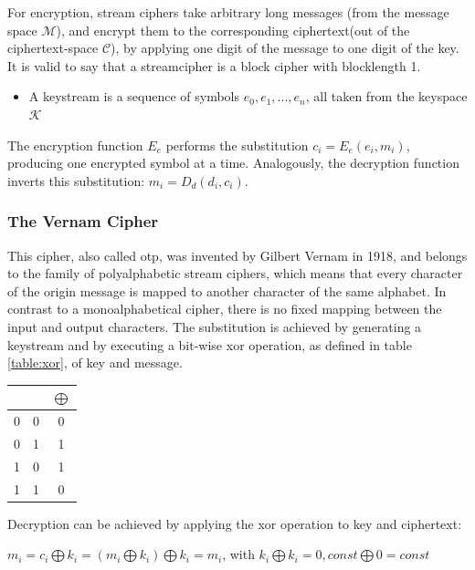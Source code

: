 For encryption, stream ciphers take arbitrary long messages (from the message space $\mathcal{M}$), and encrypt
them to the corresponding ciphertext(out of the ciphertext-space $\mathcal{C}$), by applying
one digit of the message to one digit of the key. It is valid to say that a streamcipher is a block cipher with blocklength 1.

\begin{itemize}
 \item A keystream is a sequence of symbols $e_0, e_1, ..., e_n$, all taken from the keyspace $\mathcal{K}$
\end{itemize}

The encryption function $E_e$ performs the substitution $c_i = E_e(e_i, m_i)$, producing one encrypted symbol at a time. Analogously,
the decryption function inverts this substitution: $m_i = D_d(d_i, c_i)$.

\subsubsection{The Vernam Cipher} 

This cipher, also called \gls{otp}, was invented by Gilbert Vernam in 1918, and belongs to the family of polyalphabetic stream ciphers,
which means that every character of the origin message is mapped to another character of the same alphabet. In contrast to a monoalphabetical cipher,
there is no fixed mapping between the input and output characters.
The substitution is achieved by generating a keystream and by executing 
a bit-wise \gls{xor} operation, as defined in table \ref{table:xor}, of key and message.

\begin{center}
\begin{tabular}{ c c | c }
 \label{table:xor}
   &  & $\bigoplus$ \\ \hline
  0 & 0 & 0 \\
  0 & 1 & 1 \\
  1 & 0 & 1 \\
  1 & 1 & 0 \\
\end{tabular}
\end{center}

Decryption can be achieved by applying the \gls{xor} operation to key and ciphertext:

\begin{center}
 $m_i = c_i \bigoplus k_i = (m_i \bigoplus k_i) \bigoplus k_i = m_i$, with $ k_i \bigoplus k_i = 0, const \bigoplus 0 = const$
\end{center}



